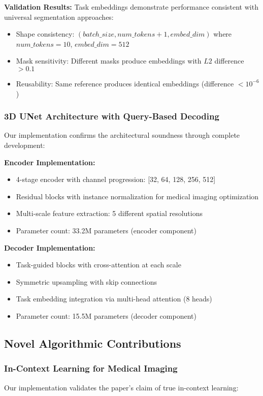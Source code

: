 \textbf{Validation Results:} Task embeddings demonstrate performance consistent with universal segmentation approaches:
\begin{itemize}
    \item Shape consistency: $(batch\_size, num\_tokens+1, embed\_dim)$ where $num\_tokens=10$, $embed\_dim=512$
    \item Mask sensitivity: Different masks produce embeddings with $L2$ difference $>0.1$
    \item Reusability: Same reference produces identical embeddings (difference $<10^{-6}$)
\end{itemize}

\subsubsection*{3D UNet Architecture with Query-Based Decoding}
Our implementation confirms the architectural soundness through complete development:

\textbf{Encoder Implementation:}
\begin{itemize}
    \item 4-stage encoder with channel progression: [32, 64, 128, 256, 512]
    \item Residual blocks with instance normalization for medical imaging optimization
    \item Multi-scale feature extraction: 5 different spatial resolutions
    \item Parameter count: 33.2M parameters (encoder component)
\end{itemize}

\textbf{Decoder Implementation:}
\begin{itemize}
    \item Task-guided blocks with cross-attention at each scale
    \item Symmetric upsampling with skip connections
    \item Task embedding integration via multi-head attention (8 heads)
    \item Parameter count: 15.5M parameters (decoder component)
\end{itemize}

\subsection*{Novel Algorithmic Contributions}

\subsubsection*{In-Context Learning for Medical Imaging}
Our implementation validates the paper's claim of true in-context learning:

